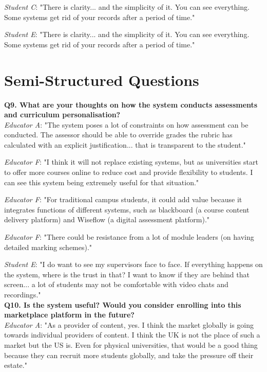 \textit{Student C}: "There is clarity... and the simplicity of it. You can see everything. Some systems get rid
of your records after a period of time."

\textit{Student E}: "There is clarity... and the simplicity of it. You can see everything. Some systems get rid
of your records after a period of time."\\

\section{Semi-Structured Questions}

\textbf{Q9. What are your thoughts on how the system conducts assessments and curriculum personalisation?}\\

\textit{Educator A}: "The system poses a lot of constraints on how assessment can be conducted.
The assessor should be able to override grades the rubric has calculated with an explicit justification...
that is transparent to the student."

\textit{Educator F}: "I think it will not replace existing systems, but as universities start to offer more
courses online to reduce cost and provide flexibility to students. I can see this system being extremely useful
for that situation."

\textit{Educator F}: "For traditional campus students, it could add value because it integrates functions of different systems,
such as blackboard (a course content delivery platform) and Wiseflow (a digital assessment platform)."

\textit{Educator F}: "There could be resistance from a lot of module leaders (on having detailed marking schemes)."

\textit{Student E}: "I do want to see my supervisors face to face. If everything happens on the system, 
where is the trust in that? I want to know if they are behind that screen... a lot of students may not be comfortable 
with video chats and recordings."\\

\textbf{Q10. Is the system useful? Would you consider enrolling into this marketplace platform in the future?}\\

\textit{Educator A}: "As a provider of content, yes. I think the market globally is going towards
individual providers of content. I think the UK is not the place of such a market but the US is.
Even for physical universities, that would be a good thing because they can recruit more students globally, and
take the pressure off their estate."

